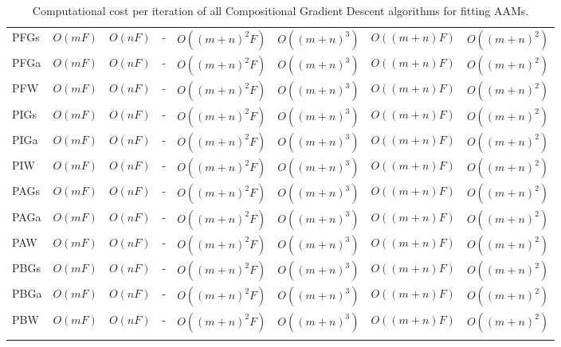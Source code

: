 \begin{table*}
\begin{tabular}{lccccccc}
PFGs & $O(mF)$ & $O(nF)$ & - & $O((m+n)^2F)$ & $O((m+n)^3)$ & $O((m+n)F)$ & $O((m+n)^2)$ \\
PFGa & $O(mF)$ & $O(nF)$ & - & $O((m+n)^2F)$ & $O((m+n)^3)$ & $O((m+n)F)$ & $O((m+n)^2)$ \\
PFW & $O(mF)$ & $O(nF)$ & - & $O((m+n)^2F)$ & $O((m+n)^3)$ & $O((m+n)F)$ & $O((m+n)^2)$ \\

PIGs & $O(mF)$ & $O(nF)$ & - & $O((m+n)^2F)$ & $O((m+n)^3)$ & $O((m+n)F)$ & $O((m+n)^2)$ \\
PIGa & $O(mF)$ & $O(nF)$ & - & $O((m+n)^2F)$ & $O((m+n)^3)$ & $O((m+n)F)$ & $O((m+n)^2)$ \\
PIW & $O(mF)$ & $O(nF)$ & - & $O((m+n)^2F)$ & $O((m+n)^3)$ & $O((m+n)F)$ & $O((m+n)^2)$ \\

PAGs & $O(mF)$ & $O(nF)$ & - & $O((m+n)^2F)$ & $O((m+n)^3)$ & $O((m+n)F)$ & $O((m+n)^2)$ \\
PAGa & $O(mF)$ & $O(nF)$ & - & $O((m+n)^2F)$ & $O((m+n)^3)$ & $O((m+n)F)$ & $O((m+n)^2)$ \\
PAW & $O(mF)$ & $O(nF)$ & - & $O((m+n)^2F)$ & $O((m+n)^3)$ & $O((m+n)F)$ & $O((m+n)^2)$ \\

PBGs & $O(mF)$ & $O(nF)$ & - & $O((m+n)^2F)$ & $O((m+n)^3)$ & $O((m+n)F)$ & $O((m+n)^2)$ \\
PBGa & $O(mF)$ & $O(nF)$ & - & $O((m+n)^2F)$ & $O((m+n)^3)$ & $O((m+n)F)$ & $O((m+n)^2)$ \\
PBW & $O(mF)$ & $O(nF)$ & - & $O((m+n)^2F)$ & $O((m+n)^3)$ & $O((m+n)F)$ & $O((m+n)^2)$ \\

\noalign{\smallskip}\hline
\end{tabular}
\caption{Computational cost per iteration of all Compositional Gradient Descent algorithms for fitting AAMs.}
\label{tab:complexity}  
\end{table*}